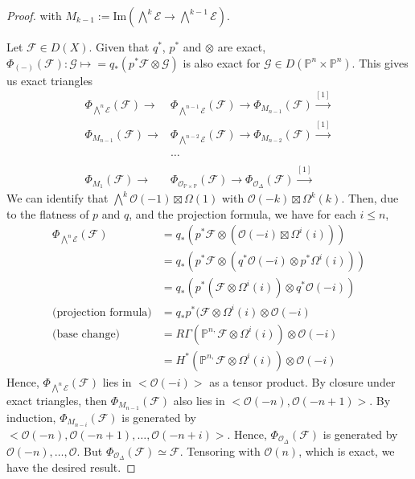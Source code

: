 \begin{proof}
with $M_{k-1}:= \text{Im} (\bigwedge^{k}\mathcal{E} \to \bigwedge^{k-1}\mathcal{E})$.  

Let $\mathcal{F} \in D(X)$. Given that $q^*$, $p^*$ and $\otimes$ are exact, $\Phi_{(-)}  (\mathcal{F}): \mathcal{G} \mapsto =q_{*}(p^{*}\mathcal{F} \otimes \mathcal{G})$ is also exact for $\mathcal{G} \in D(\mathbb{P}^{n}\times \mathbb{P}^n)$. This gives us exact triangles
$$
\begin{align}
 \Phi_{\bigwedge^{n}\mathcal{E}} (\mathcal{F}) \to &\Phi_{\bigwedge^{n-1}\mathcal{E}} (\mathcal{F})\to \Phi_{M_{n-1}}(\mathcal{F})\xrightarrow{[1]}   \\
\Phi_{M_{n-1}}(\mathcal{F})\to & \Phi_{\bigwedge^{n-2}\mathcal{E}} (\mathcal{F})\to \Phi_{M_{n-2}}(\mathcal{F})\xrightarrow{[1]}  \\  \\
&\dots \\  \\
 \Phi_{M_{1}}(\mathcal{F})\to &\Phi_{\mathcal{O}_{\mathbb{P}\times \mathbb{P}} }(\mathcal{F})\to \Phi_{\mathcal{O}_{\Delta}} (\mathcal{F})\xrightarrow{[1]}
\end{align}
$$
We can identify that $\bigwedge^{k}\mathcal{O}(-1)\boxtimes\Omega(1)$ with $\mathcal{O}(-k)\boxtimes\Omega^k(k)$. Then, due to the flatness of $p$ and $q$, and the projection formula, we have for each $i \leq n$, $$\begin{align}
 \Phi_{\bigwedge^{n}\mathcal{E}} (\mathcal{F}) &= q_{*}(p^{*}\mathcal{F }\otimes  (\mathcal{O}(-i)\boxtimes \Omega^i(i))) \\
&= q_{*}(p^{*}\mathcal{F }\otimes  (q^{*}\mathcal{O}(-i)\otimes  p^{*}\Omega^i(i))) \\
&= q_{*}(p^{*}(\mathcal{F}\otimes \Omega^{i}(i)) \otimes  q^{*}\mathcal{O}(-i)) \\
\text{(projection formula)} &=q_{*}p^{*}(\mathcal{F}\otimes \Omega^{i}(i) \otimes  \mathcal{O}(-i)\\
\text{(base change)} &= R\Gamma(\mathbb{P}^{n,}\mathcal{F}\otimes \Omega^{i}(i))\otimes \mathcal{O}(-i) \\
&= H^{*}(\mathbb{P}^{n,}\mathcal{F}\otimes \Omega^{i}(i)) \otimes \mathcal{O}(-i)  
\end{align}$$
Hence,  $\Phi_{\bigwedge^{n}\mathcal{E}} (\mathcal{F})$ lies in $<\mathcal{O}(-i)>$ as a tensor product. By closure under exact triangles, then $\Phi_{M_{n-1}}(\mathcal{F})$ also lies in $<\mathcal{O}(-n), \mathcal{O}(-n+1)>$. By induction, $\Phi_{M_{n-i}}(\mathcal{F})$ is generated by $<\mathcal{O}(-n),\mathcal{O}(-n+1),\dots,\mathcal{O}(-n+i)>$. Hence, $\Phi_{\mathcal{O}_\Delta}(\mathcal{F})$ is generated by $\mathcal{O}(-n),\dots,\mathcal{O}$. But $\Phi_{\mathcal{O}_\Delta}(\mathcal{F}) \simeq \mathcal{ F}$.  Tensoring with $\mathcal{O}(n)$, which is exact, we have the desired result. 


\end{proof}